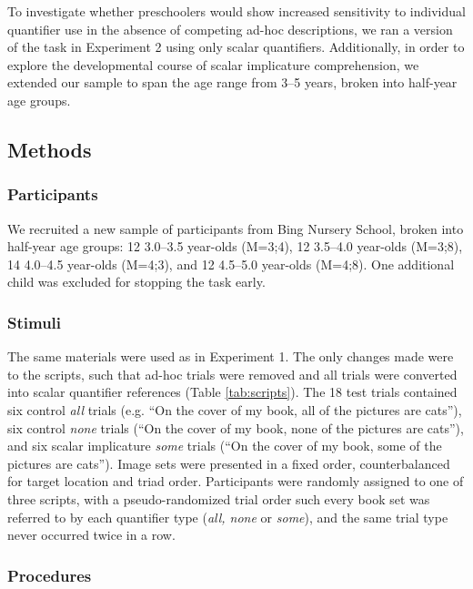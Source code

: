 \documentclass[10pt,letterpaper]{article}
\begin{document}
To investigate whether preschoolers would show increased sensitivity to individual quantifier use in the absence of competing ad-hoc descriptions, we ran a version of the task in Experiment 2 using only scalar quantifiers. Additionally, in order to explore the developmental course of scalar implicature comprehension, we extended our sample to span the age range from 3--5 years, broken into half-year age groups.

\subsection{Methods}

\subsubsection{Participants}

We recruited a new sample of participants from Bing Nursery School, broken into half-year age groups: 12 3.0--3.5 year-olds (M=3;4), 12 3.5--4.0 year-olds (M=3;8), 14 4.0--4.5 year-olds (M=4;3), and 12 4.5--5.0 year-olds (M=4;8).  One additional child was excluded for stopping the task early. 

\subsubsection{Stimuli}

The same materials were used as in Experiment 1. The only changes made were to the scripts, such that ad-hoc trials were removed and all trials were converted into scalar quantifier references (Table \ref{tab:scripts}).  The 18 test trials contained six control \emph{all} trials (e.g. ``On the cover of my book, all of the pictures are cats''), six control \emph{none} trials (``On the cover of my book, none of the pictures are cats''), and six scalar implicature \emph{some} trials (``On the cover of my book, some of the pictures are cats'').  Image sets were presented in a fixed order, counterbalanced for target location and triad order. Participants were randomly assigned to one of three scripts, with a pseudo-randomized trial order such every book set was referred to by each quantifier type (\emph{all, none} or \emph{some}), and the same trial type never occurred twice in a row.

\subsubsection{Procedures}
\end{document}
